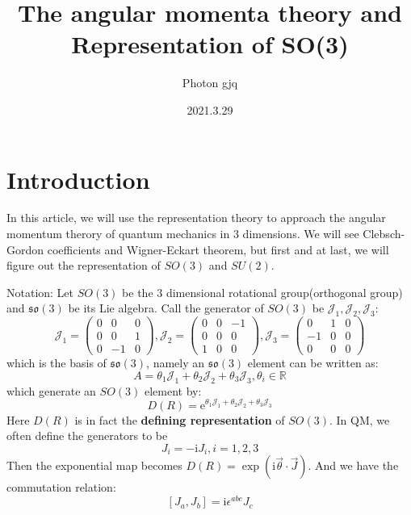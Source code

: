 \documentclass{article}
\title{ The angular momenta theory and Representation of SO(3)}
\date{2021.3.29}
\author{Photon gjq}
\begin{document}
	\maketitle
	\tableofcontents
	
	\newtheorem{definition}{Definition}
	


	\section{Introduction}
	In this article, we will use the representation theory to approach the angular momentum therory of quantum mechanics in $3$ dimensions. We will see Clebsch-Gordon coefficients and Wigner-Eckart theorem, but first and at last, we will figure out the representation of $SO( 3)$ and $SU( 2)$. 
	
	
	
	Notation: Let $SO( 3)$ be the $3$ dimensional rotational group(orthogonal group) and $\mathfrak{so}( 3)$ be its Lie algebra. Call the generator of $SO( 3)$ be $\mathcal{J}_{1} ,\mathcal{J}_{2} ,\mathcal{J}_{3}$:
	\begin{equation*}
		\mathcal{J}_{1} =\begin{pmatrix}
			0 & 0 & 0\\
			0 & 0 & 1\\
			0 & -1 & 0
		\end{pmatrix} ,\mathcal{J}_{2} =\begin{pmatrix}
			0 & 0 & -1\\
			0 & 0 & 0\\
			1 & 0 & 0
		\end{pmatrix} ,\mathcal{J}_{3} =\begin{pmatrix}
			0 & 1 & 0\\
			-1 & 0 & 0\\
			0 & 0 & 0
		\end{pmatrix}
	\end{equation*}
	which is the basis of $\mathfrak{so}( 3)$, namely an $\mathfrak{so}( 3)$ element can be written as:
	\begin{equation*}
		A=\theta _{1}\mathcal{J}_{1} +\theta _{2}\mathcal{J}_{2} +\theta _{3}\mathcal{J}_{3} ,\theta _{i} \in \mathbb{R}
	\end{equation*}
	which generate an $SO( 3)$ element by:
	\begin{equation*}
		D( R) =\mathrm{e}^{\theta _{1}\mathcal{J}_{1} +\theta _{2}\mathcal{J}_{2} +\theta _{3}\mathcal{J}_{3}}
	\end{equation*}
	Here $D( R)$ is in fact the \textbf{defining representation} of $SO( 3)$.	In QM, we often define the generators to be
	\begin{equation*}
		J_{i} =-\mathrm{i} J_{i} ,i=1,2,3
	\end{equation*}
	Then the exponential map becomes $D( R) =\exp(\mathrm{i}\vec{\theta } \cdot \vec{J})$. And we have the commutation relation:
	\begin{equation*}
		\boxed{[ J_{a} ,J_{b}] =\mathrm{i} \epsilon ^{abc} J_{c}}
	\end{equation*}
\end{document}
